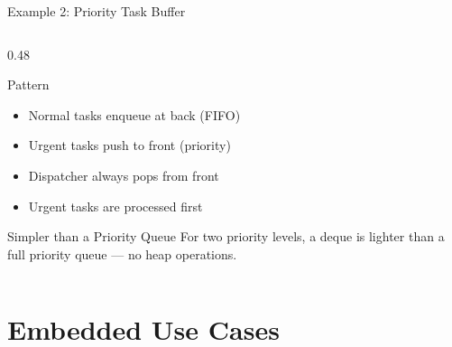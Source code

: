 \documentclass[aspectratio=169, 10pt]{beamer}
\begin{document}
\begin{frame}[fragile]{Example 2: Priority Task Buffer}
\begin{columns}[T]
\begin{column}{0.48\textwidth}
\begin{center}
\end{center}

\vspace{0.5em}
\begin{block}{Pattern}
\begin{itemize}
  \item Normal tasks enqueue at back (FIFO)
  \item Urgent tasks push to front (priority)
  \item Dispatcher always pops from front
  \item Urgent tasks are processed first
\end{itemize}
\end{block}

\begin{alertblock}{Simpler than a Priority Queue}
For two priority levels, a deque is lighter than a
full priority queue --- no heap operations.
\end{alertblock}
\end{column}
\end{columns}
\end{frame}

\section{Embedded Use Cases}
\end{document}

